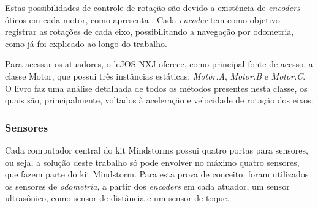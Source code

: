 		Estas possibilidades de controle de rotação são devido a existência de \textit{encoders} óticos em cada motor, como apresenta \cite{legonxj}. Cada \textit{encoder} tem como objetivo registrar as rotações de cada eixo, possibilitando a navegação por odometria, como já foi explicado ao longo do trabalho.

		Para acessar os atuadores, o leJOS NXJ oferece, como principal fonte de acesso, a classe Motor, que possui três instâncias estáticas: \textit{Motor.A}, \textit{Motor.B} e \textit{Motor.C}. O livro \cite{legonxj} faz uma análise detalhada de todos os métodos presentes nesta classe, os quais são, principalmente, voltados à aceleração e velocidade de rotação dos eixos.

	\subsubsection{Sensores}

		Cada computador central do kit Mindstorms possui quatro portas para sensores, ou seja, a solução deste trabalho só pode envolver no máximo quatro sensores, que fazem parte do kit Mindstorm. Para esta prova de conceito, foram utilizados os sensores de \textit{odometria}, a partir dos \textit{encoders} em cada atuador, um sensor ultrasônico, como sensor de distância e um sensor de toque.

